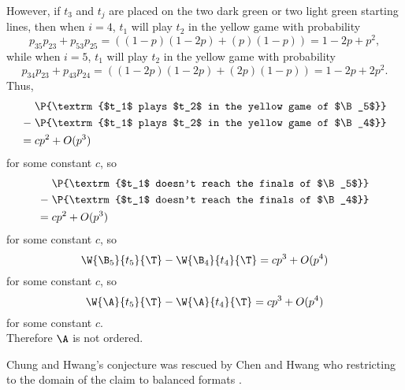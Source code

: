 {{        However, if $t_3$ and $t_j$ are placed on the two dark green or two light green starting lines, then when $i = 4$, $t_1$  will play $t_2$ in the yellow game with probability $$p_{35}p_{23} + p_{53}p_{25} = ((1-p)(1-2p) + (p)(1-p)) = 1-2p+p^2,$$ while when $i = 5$, $t_1$ will play $t_2$ in the yellow game with probability $$p_{34}p_{23} + p_{43}p_{24} = ((1-2p)(1-2p) + (2p)(1-p)) = 1-2p+2p^2.$$
        Thus, \begin{align*}
            &\P{\textrm{$t_1$ plays $t_2$ in the yellow game of $\B_5$}}\\
            - \;&\P{\textrm{$t_1$ plays $t_2$ in the yellow game of $\B_4$}}\\
             = \;&cp^2 + O(p^3)
        \end{align*}
        for some constant $c$, so
        \begin{align*}
            &\P{\textrm{$t_1$ doesn't reach the finals of $\B_5$}}\\
            - \;&\P{\textrm{$t_1$ doesn't reach the finals of $\B_4$}}\\
             = \;&cp^2 + O(p^3)
        \end{align*}
        for some constant $c$, so
        $$\W{\B_5}{t_5}{\T} - \W{\B_4}{t_4}{\T} = cp^3 + O(p^4)$$
        for some constant $c$, so
        $$\W{\A}{t_5}{\T} - \W{\A}{t_4}{\T} = cp^3 + O(p^4)$$ for some constant $c.$\\

        Therefore $\A$ is not ordered.
    }{}

    Chung and Hwang's conjecture was rescued by Chen and Hwang who restricting to the domain of the claim to balanced formats \cite{totally_random_balanced}.

    }
